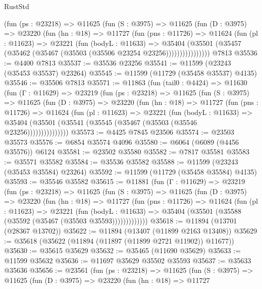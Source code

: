 \begin{lexlean}{RustStd}
\begin{coremodule}
          (fun (ps : @23218) =>
          @11625
            (fun (S : @3975) =>
            @11625
              (fun (D : @3975) =>
              @23220
                (fun (hn : @18) =>
                @11727
                  (fun (pns : @11726) =>
                  @11624
                    (fun (pl : @11623) =>
                    @23221
                      (fun (bodyL : @11633) =>
                      @35404
                        (@35501
                          (@35457 (@35462 (@35467 (@35503 (@35506 @23254 @23256))))))))))))))))
    @7813
@35536 := @4400 @7813
@35537 := @35536 @23256
@35541 := @11599 (@23243 (@35453 @35537) @23264)
@35545 := @11599 (@11729 (@35458 @35537) @4135)
@35546 := @35506 @7813
@35571 := @11863
    (fun (tail0 : @4424) =>
    @11630
      (fun (Γ : @11629) =>
      @23219
        (fun (ps : @23218) =>
        @11625
          (fun (S : @3975) =>
          @11625
            (fun (D : @3975) =>
            @23220
              (fun (hn : @18) =>
              @11727
                (fun (pns : @11726) =>
                @11624
                  (fun (pl : @11623) =>
                  @23221
                    (fun (bodyL : @11633) =>
                    @35404 (@35501 (@35541 (@35545 (@35467 (@35503 (@35546 @23256)))))))))))))))
@35573 := @4425 @7845 @23506
@35574 := @23503 @35573
@35576 := @6854 @35574 @4096
@35580 := @6064 (@6089 (@4456 @35576)) @6124
@35581 := @23502 @35580
@35582 := @7817 @35581
@35583 := @35571 @35582
@35584 := @35536 @35582
@35588 := @11599 (@23243 (@35453 @35584) @23264)
@35592 := @11599 (@11729 (@35458 @35584) @4135)
@35593 := @35546 @35582
@35615 := @11881
    (fun (Γ : @11629) =>
    @23219
      (fun (ps : @23218) =>
      @11625
        (fun (S : @3975) =>
        @11625
          (fun (D : @3975) =>
          @23220
            (fun (hn : @18) =>
            @11727
              (fun (pns : @11726) =>
              @11624
                (fun (pl : @11623) =>
                @23221
                  (fun (bodyL : @11633) =>
                  @35404 (@35501 (@35588 (@35592 (@35467 (@35503 @35593)))))))))))))
@35618 := @11894 (@13701 (@28367 @13702))
@35622 := @11894 (@13407 (@11899 @2163 @13408))
@35629 := @35618 (@35622 (@11894 (@11897 (@11899 @2721 @11902)) @11677))
@35630 := @35615 @35629
@35632 := @35465 (@11690 @35629)
@35633 := @11599 @35632
@35636 := @11697 @35629 @35502 @35593
@35637 := @35633 @35636
@35656 := @23561
    (fun (ps : @23218) =>
    @11625
      (fun (S : @3975) =>
      @11625
        (fun (D : @3975) =>
        @23220
          (fun (hn : @18) =>
          @11727

\end{coremodule}
\end{lexlean}
